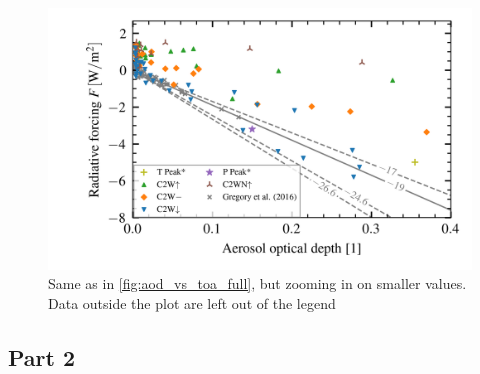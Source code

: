 \documentclass{ametsocV5}
\begin{document}
\begin{figure}[t]
  \begin{center}
    \includegraphics[width=0.95\linewidth]{figures/aod_vs_toa_avg_inset.png}
  \end{center}
  \caption{Same as in \cref{fig:aod_vs_toa_full}, but zooming in on smaller values. Data
    outside the plot are left out of the legend}%
  \label{fig:aod_vs_toa_inset}
\end{figure}


\subsection{Part 2}
\end{document}
